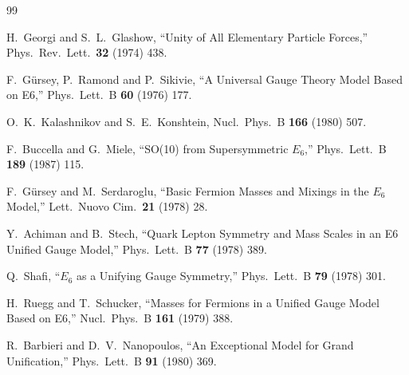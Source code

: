 \documentclass[a4paper,12pt]{article}
\begin{document}
\begin{thebibliography}{99}

H.~Georgi and S.~L.~Glashow,
``Unity of All Elementary Particle Forces,''
Phys.\ Rev.\ Lett.\ {\bf 32} (1974) 438.

F.~G\"ursey, P.~Ramond and P.~Sikivie,
``A Universal Gauge Theory Model Based on E6,''
Phys.\ Lett.\ B {\bf 60} (1976) 177.

  O.~K.~Kalashnikov and S.~E.~Konshtein,
  Nucl.\ Phys.\ B {\bf 166} (1980) 507.

F.~Buccella and G.~Miele,
``SO(10) from Supersymmetric $E_{6}$,''
Phys.\ Lett.\ B {\bf 189} (1987) 115.

F.~G\"ursey and M.~Serdaroglu,
``Basic Fermion Masses and Mixings in the $E_{6}$ Model,''
Lett.\ Nuovo Cim.\ {\bf 21} (1978) 28.

Y.~Achiman and B.~Stech,
``Quark Lepton Symmetry and Mass Scales in an E6 Unified Gauge Model,''
Phys.\ Lett.\ B {\bf 77} (1978) 389.

Q.~Shafi,
``$E_{6}$ as a Unifying Gauge Symmetry,''
Phys.\ Lett.\ B {\bf 79} (1978) 301.

H.~Ruegg and T.~Schucker,
``Masses for Fermions in a Unified Gauge Model Based on E6,''
Nucl.\ Phys.\ B {\bf 161} (1979) 388.

R.~Barbieri and D.~V.~Nanopoulos,
``An Exceptional Model for Grand Unification,''
Phys.\ Lett.\ B {\bf 91} (1980) 369.


\end{thebibliography}
\end{document}

